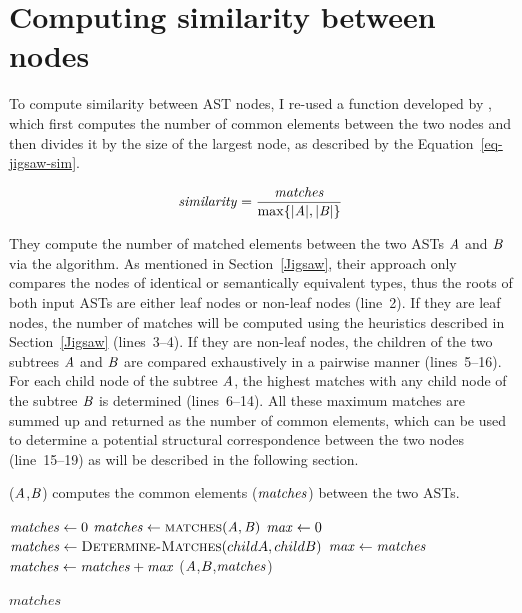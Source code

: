 \section{Computing similarity between nodes}  \label{jigsaw-similarity}
To compute similarity between AST nodes, I re-used a function developed by \citet{2008:fse:cottrell}, which first computes the number of common elements between the two nodes and then divides it by the size of the largest node, as described by the Equation~\ref{eq-jigsaw-sim}.


\begin{equation}\label{eq-jigsaw-sim}
\mathit{similarity} = \frac{\mathit{matches}}{\max\{|\mathit{A}|, |\mathit{B}|\}}
\end{equation}


They compute the number of matched elements between the two ASTs $\mathit{A}$ and $\mathit{B}$ via the  algorithm. As mentioned in Section~\ref{Jigsaw}, their approach only compares the nodes of identical or semantically equivalent types, thus the roots of both input ASTs are either leaf nodes or non-leaf nodes (line~2). If they are leaf nodes, the number of matches will be computed using the heuristics described in Section~\ref{Jigsaw} (lines~3--4). If they are  non-leaf nodes, the children of the two subtrees $\mathit{A}$ and $\mathit{B}$ are compared exhaustively in a pairwise manner (lines~5--16). For each child node of the subtree $\mathit{A}$, the highest matches with any child node of the subtree $\mathit{B}$ is determined (lines~6--14). All these maximum matches are summed up and returned as the number of common elements, which can be used to determine a potential structural correspondence between the two nodes (line~15--19) as will be described in the following section.

\begin{algorithm}
 \caption{($\mathit{A}$,$\mathit{B}$) computes the common elements ($\mathit{matches}$) between the two ASTs.}
  \label{simi}
  \begin{algorithmic}[1]
  \ComputeMatches
  \State $\mathit{matches} \gets 0$
  \State $\mathit{matches} \gets  \textsc{matches}(\mathit{A},\mathit{B})$
		\State $\mathit{max} \gets 0$
			\State $\mathit{matches} \gets  \textsc{Determine-Matches}(childA,childB)$
 		\State $\mathit{max} \gets \mathit{matches}$	
		\EndIf
 \EndFor 	
	  \EndFor 	
	    \State $\mathit{matches} \gets  \mathit{matches} +  \mathit{max}$
 \EndIf
 \State {}($\mathit{A}$,$\mathit{B}$,$\mathit{matches}$)
 		\EndIf 		


 \Return $matches$
\end{algorithmic}
\end{algorithm}



